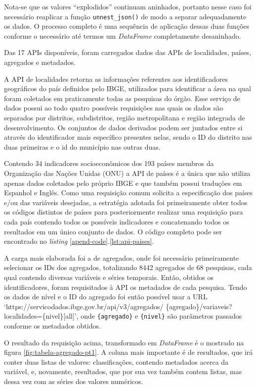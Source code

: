     Nota-se que os valores ``explodidos'' continuam aninhados, portanto nesse caso foi necessário reaplicar a função \lstinline{unnest_json()} de modo a separar adequadamente os dados. O processo completo é uma sequência de aplicação dessas duas funções conforme o necessário até termos um \textit{DataFrame} completamente desaninhado.

    Das 17 APIs disponíveis, foram carregados dados das APIs de localidades, países, agregados e metadados. 
    
    A API de localidades retorna as informações referentes aos identificadores geográficos do país definidos pelo IBGE, utilizados para identificar a área na qual foram coletados em praticamente todas as pesquisas do órgão. Esse serviço de dados possui ao todo quatro possíveis requisições nas quais os dados são separados por distritos, subdistritos, região metropolitana e região integrada de desenvolvimento. Os conjuntos de dados derivados podem ser juntados entre si através do identificador mais específico presentes nelas, sendo o ID do distrito nas duas primeiras e o id do município nas outras duas.

    Contendo 34 indicadores socioeconômicos dos 193 países membros da Organização das Nações Unidas (ONU) a API de países é a única que não utiliza apenas dados coletados pelo próprio IBGE e que também possui traduções em Espanhol e Inglês. Como uma requisição comum solicita a especificação dos países e/ou das variáveis desejadas, a estratégia adotada foi primeiramente obter todos os códigos distintos de países para posteriormente realizar uma requisição para cada país contendo todos os possíveis indicadores e concatenando todos os resultados em um único conjunto de dados. O código completo pode ser encontrado no \textit{listing} \ref{apend-code}.\ref{lst:api-paises}.

    A carga mais elaborada foi a de agregados, onde foi necessário primeiramente selecionar os IDs dos agregados, totalizando 8442 agregados de 68 pesquisas, cada qual contendo diversas variáveis e séries temporais. Então, obtidos os identificadores, foram requisitados à API os metadados de cada pesquisa. Tendo os dados de nível e o ID do agregado foi então possível usar a URL `https://servicodados.ibge.gov.br/api/v3/agregados/
    \{agregado\}/variaveis?localidades=\{nivel\}[all]', onde \verb|{agregado}| e \verb|{nivel}| são parâmetros passados conforme os metadados obtidos. 
    
    O resultado da requisição acima, transformado em \textit{DataFrame} é o mostrado na figura \ref{fig:tabela-agregado-pt1}. A coluna mais importante é de resultados, que irá conter duas listas de valores: classificações, contendo metadados acerca da variável, e, novamente, resultados, que por sua vez também contem listas, mas dessa vez com as séries dos valores numéricos. 
    
